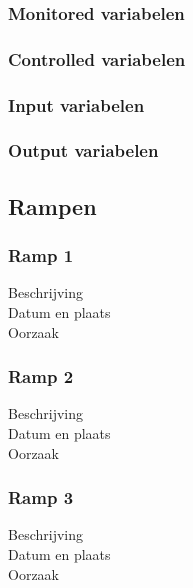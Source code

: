 \documentclass{article}
\begin{document}
	\subsubsection{Monitored variabelen}
	\subsubsection{Controlled variabelen}
	\subsubsection{Input variabelen}
	\subsubsection{Output variabelen}
	
	\subsection{Rampen}
	
	\subsubsection{Ramp 1}
	\begin{description}
		\item[Beschrijving]
		\item[Datum en plaats] 
		\item[Oorzaak]
	\end{description}
	
	\subsubsection{Ramp 2}
	\begin{description}
		\item[Beschrijving]
		\item[Datum en plaats] 
		\item[Oorzaak]
	\end{description}
	
	\subsubsection{Ramp 3}
	\begin{description}
		\item[Beschrijving]
		\item[Datum en plaats] 
		\item[Oorzaak]
	\end{description}
	
\end{document}
